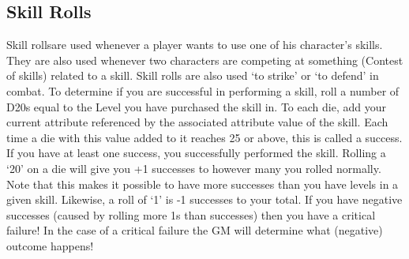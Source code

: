 \documentclass[twoside]{book}
\begin{document}
  

  
    

\subsection{Skill Rolls}
     Skill rollsare used whenever a player wants to use
               one of his character's skills. They are also used
               whenever two characters are competing at something
               (Contest of skills) related to a skill. Skill rolls are
               also used `to strike' or `to
               defend' in combat.  To determine if you are successful in performing a
               skill, roll a number of D20s equal to the Level you have
               purchased the skill in. To each die, add your current
               attribute referenced by the associated attribute value of
               the skill. Each time a die with this value added to it
               reaches 25 or above, this is called a success. If you have
               at least one success, you successfully performed the
               skill. Rolling a `20' on a die will give you
               +1 successes to however many you rolled normally. Note
               that this makes it possible to have more successes than
               you have levels in a given skill. Likewise, a roll of
               `1' is -1 successes to your total. If you have
               negative successes (caused by rolling more 1s than
               successes) then you have a critical failure! In the case
               of a critical failure the GM will determine what
               (negative) outcome happens! 
\end{document}
